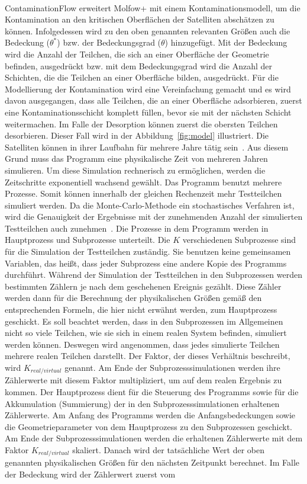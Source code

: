 \documentclass{listhesis}
\begin{document}
\paragraph{}
ContaminationFlow erweitert Molfow+ mit einem Kontaminationsmodell, um die Kontamination an den kritischen Oberflächen der Satelliten abschätzen zu können. Infolgedessen wird zu den oben genannten relevanten Größen auch die Bedeckung ($\theta^*$) bzw. der Bedeckungsgrad ($\theta$) hinzugefügt. Mit der Bedeckung wird die Anzahl der Teilchen, die sich an einer Oberfläche der Geometrie befinden, ausgedrückt bzw. mit dem Bedeckungsgrad wird die Anzahl der Schichten, die die Teilchen an einer Oberfläche bilden, ausgedrückt. Für die Modellierung der Kontamination wird eine Vereinfachung gemacht und es wird davon ausgegangen, dass alle Teilchen, die an einer Oberfläche adsorbieren, zuerst eine Kontaminationsschicht komplett füllen, bevor sie mit der nächsten Schicht weitermachen. Im Falle der Desorption können zuerst die obersten Teilchen desorbieren. Dieser Fall wird in der Abbildung~\ref{fig:model} illustriert. Die Satelliten können in ihrer Laufbahn für mehrere Jahre tätig sein~\cite{jiao}. Aus diesem Grund muss das Programm eine physikalische Zeit von mehreren Jahren simulieren. Um diese Simulation rechnerisch zu ermöglichen, werden die Zeitschritte exponentiell wachsend gewählt. Das Programm benutzt mehrere Prozesse. Somit können innerhalb der gleichen Rechenzeit mehr Testteilchen simuliert werden. Da die Monte-Carlo-Methode ein stochastisches Verfahren ist, wird die Genauigkeit der Ergebnisse mit der zunehmenden Anzahl der simulierten Testteilchen auch zunehmen~\cite{fenrg}. Die Prozesse in dem Programm werden in Hauptprozess und Subprozesse unterteilt. Die $K$ verschiedenen Subprozesse sind für die Simulation der Testteilchen zuständig. Sie benutzen keine gemeinsamen Variablen, das heißt, dass jeder Subprozess eine andere Kopie des Programms durchführt. Während der Simulation der Testteilchen in den Subprozessen werden bestimmten Zählern je nach dem geschehenen Ereignis gezählt. Diese Zähler werden dann für die Berechnung der physikalischen Größen gemäß den entsprechenden Formeln, die hier nicht erwähnt werden, zum Hauptprozess geschickt. Es soll beachtet werden, dass in den Subprozessen im Allgemeinen nicht so viele Teilchen, wie sie sich in einem realen System befinden, simuliert werden können. Deswegen wird angenommen, dass jedes simulierte Teilchen mehrere realen Teilchen darstellt. Der Faktor, der dieses Verhältnis beschreibt, wird $K_{real/virtual}$ genannt. Am Ende der Subprozesssimulationen werden ihre Zählerwerte mit diesem Faktor multipliziert, um auf dem realen Ergebnis zu kommen. Der Hauptprozess dient für die Steuerung des Programms sowie für die Akkumulation (Summierung) der in den Subprozesssimulationen erhaltenen Zählerwerte. Am Anfang des Programms werden die Anfangsbedeckungen sowie die Geometrieparameter von dem Hauptprozess zu den Subprozessen geschickt. Am Ende der Subprozesssimulationen werden die erhaltenen Zählerwerte mit dem Faktor $K_{real/virtual}$ skaliert. Danach wird der tatsächliche Wert der oben genannten physikalischen Größen für den nächsten Zeitpunkt berechnet. Im Falle der Bedeckung wird der Zählerwert zuerst vom 
\end{document}
